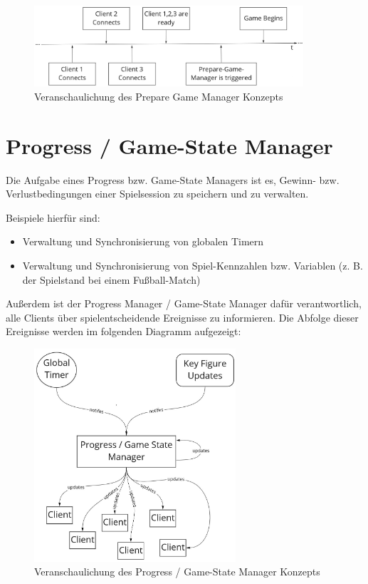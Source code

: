 \begin{figure}[H]
	\centering
	\includegraphics[width=100mm]{images/prepare_game_manager.jpg}
	\caption[Prepare-Game-Manager]{Veranschaulichung des Prepare Game Manager Konzepts}
	\label{pic:prepare_game_manager}
\end{figure}

\section{Progress / Game-State Manager}
\label{progress_manager}

Die Aufgabe eines Progress bzw. Game-State Managers ist es, Gewinn- bzw. Verlustbedingungen einer Spielsession zu speichern und zu verwalten. 

Beispiele hierfür sind: \\
\begin{itemize}
	\item Verwaltung und Synchronisierung von globalen Timern
	\item Verwaltung und Synchronisierung von Spiel-Kennzahlen bzw. Variablen (z. B. der Spielstand bei einem Fußball-Match)
\end{itemize}

Außerdem ist der Progress Manager / Game-State Manager dafür verantwortlich, alle Clients über spielentscheidende Ereignisse zu informieren. Die Abfolge dieser Ereignisse werden im folgenden Diagramm aufgezeigt:

\begin{figure}[H]
	\centering
	\includegraphics[width=75mm]{images/Progress_State_Manager.jpg}
	\caption[Progress / Game-State Manager]{Veranschaulichung des Progress / Game-State Manager Konzepts}
	\label{pic:Progress_State_Manager}
\end{figure}

